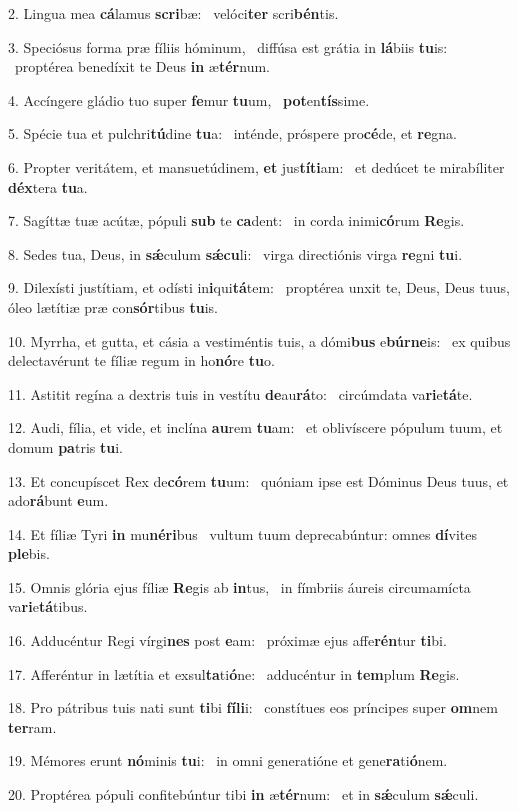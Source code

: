 2. Lingua mea \textbf{cá}lamus \textbf{scri}bæ: \ast\  velóci\textbf{ter} scri\textbf{bén}tis.\

3. Speciósus forma præ fíliis hóminum, \dag\  diffúsa est grátia in \textbf{lá}biis \textbf{tu}is: \ast\  proptérea benedíxit te Deus \textbf{in} æ\textbf{tér}num.\

4. Accíngere gládio tuo super \textbf{fe}mur \textbf{tu}um, \ast\  \textbf{pot}en\textbf{tís}sime.\

5. Spécie tua et pulchri\textbf{tú}dine \textbf{tu}a: \ast\  inténde, próspere pro\textbf{cé}de, et \textbf{re}gna.\

6. Propter veritátem, et mansuetúdinem, \textbf{et} jus\textbf{tí}\textbf{ti}am: \ast\  et dedúcet te mirabíliter \textbf{déx}tera \textbf{tu}a.\

7. Sagíttæ tuæ acútæ, pópuli \textbf{sub} te \textbf{ca}dent: \ast\  in corda inimi\textbf{có}rum \textbf{Re}gis.\

8. Sedes tua, Deus, in \textbf{sǽ}culum \textbf{sǽ}\textbf{cu}li: \ast\  virga directiónis virga \textbf{re}gni \textbf{tu}i.\

9. Dilexísti justítiam, et odísti in\textbf{i}qui\textbf{tá}tem: \ast\  proptérea unxit te, Deus, Deus tuus, óleo lætítiæ præ con\textbf{sór}tibus \textbf{tu}is.\

10. Myrrha, et gutta, et cásia a vestiméntis tuis, a dómi\textbf{bus} e\textbf{búr}\textbf{ne}is: \ast\  ex quibus delectavérunt te fíliæ regum in ho\textbf{nó}re \textbf{tu}o.\

11. Astitit regína a dextris tuis in vestítu \textbf{de}au\textbf{rá}to: \ast\  circúmdata va\textbf{ri}e\textbf{tá}te.\

12. Audi, fília, et vide, et inclína \textbf{au}rem \textbf{tu}am: \ast\  et oblivíscere pópulum tuum, et domum \textbf{pa}tris \textbf{tu}i.\

13. Et concupíscet Rex de\textbf{có}rem \textbf{tu}um: \ast\  quóniam ipse est Dóminus Deus tuus, et ado\textbf{rá}bunt \textbf{e}um.\

14. Et fíliæ Tyri \textbf{in} mu\textbf{né}\textbf{ri}bus \ast\  vultum tuum deprecabúntur: omnes \textbf{dí}vites \textbf{ple}bis.\

15. Omnis glória ejus fíliæ \textbf{Re}gis ab \textbf{in}tus, \ast\  in fímbriis áureis circumamícta va\textbf{ri}e\textbf{tá}tibus.\

16. Adducéntur Regi vírgi\textbf{nes} post \textbf{e}am: \ast\  próximæ ejus affe\textbf{rén}tur \textbf{ti}bi.\

17. Afferéntur in lætítia et exsul\textbf{ta}ti\textbf{ó}ne: \ast\  adducéntur in \textbf{tem}plum \textbf{Re}gis.\

18. Pro pátribus tuis nati sunt \textbf{ti}bi \textbf{fí}\textbf{li}i: \ast\  constítues eos príncipes super \textbf{om}nem \textbf{ter}ram.\

19. Mémores erunt \textbf{nó}minis \textbf{tu}i: \ast\  in omni generatióne et gene\textbf{ra}ti\textbf{ó}nem.\

20. Proptérea pópuli confitebúntur tibi \textbf{in} æ\textbf{tér}num: \ast\  et in \textbf{sǽ}culum \textbf{sǽ}culi.\

